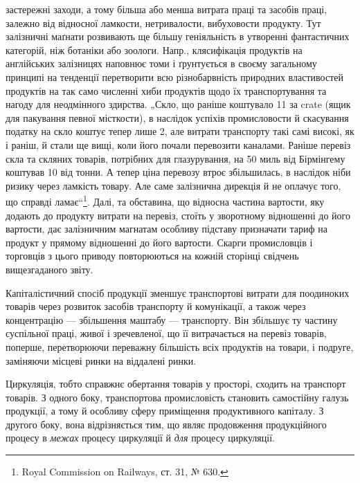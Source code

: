 \parcont{}  %
застережні заходи, а тому більша або менша витрата праці та засобів
праці, залежно від відносної ламкости, нетривалости, вибуховости продукту.
Тут залізничні маґнати розвивають ще більшу геніяльність в утворенні
фантастичних категорій, ніж ботаніки або зоологи. Напр., клясифікація
продуктів на англійських залізницях наповнює томи і ґрунтується
в своєму загальному принципі на тенденції перетворити всю різнобарвність
природних властивостей продуктів на так само численні хиби продуктів
щодо їх транспортування та нагоду для неодмінного здирства.
„Скло, що раніше коштувало 11 за crate (ящик для пакування
певної місткости), в наслідок успіхів промисловости й скасування податку
на скло коштує тепер лише 2, але витрати транспорту такі самі
високі, як і раніш, й стали ще вищі, коли його почали перевозити каналами.
Раніше перевіз скла та скляних товарів, потрібних для глазурування,
на 50 миль від Бірмінгему коштував 10 від тонни. А
тепер ціна перевозу втроє збільшилась, в наслідок ніби ризику через
ламкість товару. Але саме залізнична дирекція й не оплачує того, що
справді ламає“\footnote{
Royal Commission on Railways, ст. 31, № 630.
}. Далі, та обставина, що відносна частина вартости, яку
додають до продукту витрати на перевіз, стоїть у зворотному відношенні
до його вартости, дає залізничним магнатам особливу підставу призначати
тариф на продукт у прямому відношенні до його вартости. Скарги промисловців
і торговців з цього приводу повторюються на кожній сторінці
свідчень вищезгаданого звіту.

Капіталістичний спосіб продукції зменшує транспортові витрати для
поодиноких товарів через розвиток засобів транспорту й комунікації, а
також через концентрацію — збільшення маштабу — транспорту. Він збільшує
ту частину суспільної праці, живої і зречевленої, що її витрачається
на перевіз товарів, поперше, перетворюючи переважну більшість всіх
продуктів на товари, і подруге, заміняючи місцеві ринки на віддалені
ринки.

Циркуляція, тобто справжнє обертання товарів у просторі, сходить на
транспорт товарів. З одного боку, транспортова промисловість становить
самостійну галузь продукції, а тому й особливу сферу приміщення продуктивного
капіталу. З другого боку, вона відрізняється тим, що являє
продовження продукційного процесу в \emph{межах} процесу циркуляції й
\emph{для} процесу циркуляції.
